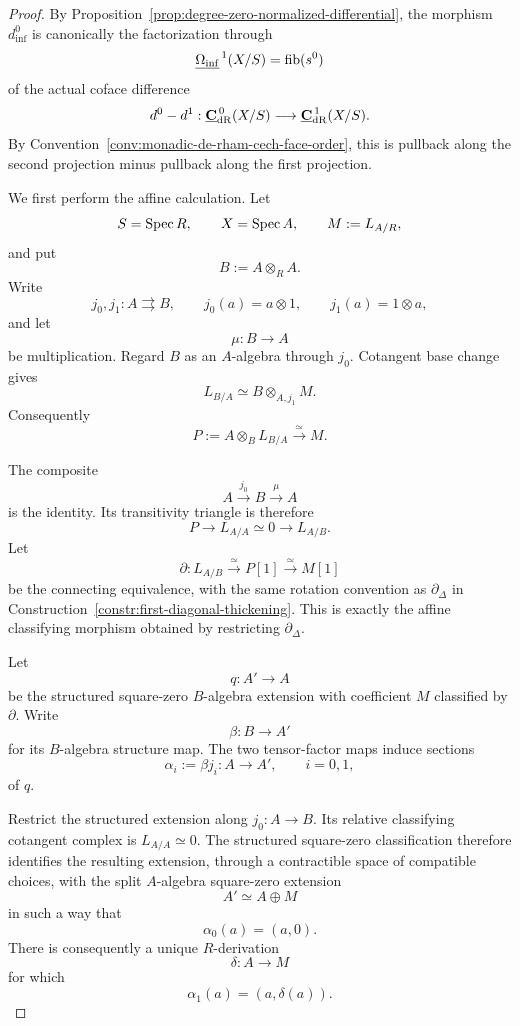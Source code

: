 \begin{proof}
By Proposition~\ref{prop:degree-zero-normalized-differential}, the morphism
\(d_{\inf}^0\) is canonically the factorization through
\[
    \underline{\Omega_{\mathrm{inf}}}^{\,1}(X/S)
    =
    \operatorname{fib}(s^0)
\]
of the actual coface difference
\[
    d^0-d^1:
    \underline{\mathbf C}_{\mathrm{dR}}^{\,0}(X/S)
    \longrightarrow
    \underline{\mathbf C}_{\mathrm{dR}}^{\,1}(X/S).
\]
By Convention~\ref{conv:monadic-de-rham-cech-face-order}, this is pullback
along the second projection minus pullback along the first projection.

We first perform the affine calculation.  Let
\[
    S=\operatorname{Spec} R,
    \qquad
    X=\operatorname{Spec} A,
    \qquad
    M:=L_{A/R},
\]
and put
\[
    B:=A\otimes_RA.
\]
Write
\[
    j_0,j_1:A\rightrightarrows B,
    \qquad
    j_0(a)=a\otimes1,
    \qquad
    j_1(a)=1\otimes a,
\]
and let
\[
    \mu:B\longrightarrow A
\]
be multiplication.  Regard \(B\) as an \(A\)-algebra through \(j_0\).  Cotangent
base change gives
\[
    L_{B/A}
    \simeq
    B\otimes_{A,j_1}M.
\]
Consequently
\[
\boxed{
    P:=A\otimes_BL_{B/A}
    \xrightarrow{\simeq}
    M.
}
\]

The composite
\[
    A\xrightarrow{j_0}B\xrightarrow{\mu}A
\]
is the identity.  Its transitivity triangle is therefore
\[
    P
    \longrightarrow
    L_{A/A}\simeq0
    \longrightarrow
    L_{A/B}.
\]
Let
\[
\boxed{
    \partial:
    L_{A/B}
    \xrightarrow{\simeq}
    P[1]
    \xrightarrow{\simeq}
    M[1]
}
\]
be the connecting equivalence, with the same rotation convention as
\(\partial_\Delta\) in
Construction~\ref{constr:first-diagonal-thickening}.  This is exactly the
affine classifying morphism obtained by restricting \(\partial_\Delta\).

Let
\[
    q:A'\longrightarrow A
\]
be the structured square-zero \(B\)-algebra extension with coefficient \(M\)
classified by \(\partial\).  Write
\[
    \beta:B\longrightarrow A'
\]
for its \(B\)-algebra structure map.  The two tensor-factor maps induce
sections
\[
    \alpha_i:=\beta j_i:
    A\longrightarrow A',
    \qquad i=0,1,
\]
of \(q\).

Restrict the structured extension along \(j_0:A\to B\).  Its relative
classifying cotangent complex is \(L_{A/A}\simeq0\).  The structured
square-zero classification therefore identifies the resulting extension,
through a contractible space of compatible choices, with the split
\(A\)-algebra square-zero extension
\[
    A'\simeq A\oplus M
\]
in such a way that
\[
    \alpha_0(a)=(a,0).
\]
There is consequently a unique \(R\)-derivation
\[
    \delta:A\longrightarrow M
\]
for which
\[
    \alpha_1(a)=(a,\delta(a)).
\]


\end{proof}

